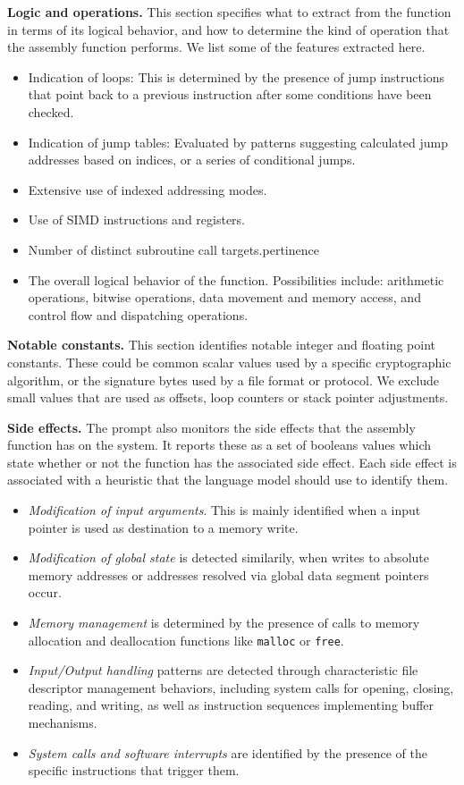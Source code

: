 \noindent \textbf{Logic and operations.}
This section specifies what to extract from the function in terms of its logical behavior, and how to determine the kind of
operation that the assembly function performs. We list some of the features extracted here.

\begin{itemize}
\item Indication of loops: This is determined by the presence of jump instructions that point back to a previous
instruction after some conditions have been checked.
\item Indication of jump tables: Evaluated by patterns suggesting calculated jump addresses based on
indices, or a series of conditional jumps.
\item Extensive use of indexed addressing modes.
\item Use of SIMD instructions and registers.
\item Number of distinct subroutine call targets.pertinence
\item The overall logical behavior of the function. Possibilities include: arithmetic operations, bitwise operations, data movement and memory access,
and control flow and dispatching operations.
\end{itemize}

\noindent \textbf{Notable constants.}
This section identifies notable integer and floating point constants.  These could be common scalar values used by
a specific cryptographic algorithm, or the signature bytes used by a file format or protocol. We exclude small
values that are used as offsets, loop counters or stack pointer adjustments.

\noindent \textbf{Side effects.}
The prompt also monitors the side effects that the assembly function has on the system.
It reports these as a set of booleans values which state whether or not the function has
the associated side effect. Each side effect is associated with a heuristic that the language model
should use to identify them.

\begin{itemize}
    \item \textit{Modification of input arguments}. This is mainly identified when a input pointer is used as destination to a memory write.
    \item \textit{Modification of global state} is detected similarily, when writes to absolute memory addresses or addresses resolved via global
        data segment pointers occur.
    \item \textit{Memory management} is determined by the presence of calls to memory allocation and deallocation
        functions like \texttt{malloc} or \texttt{free}.
    \item \textit{Input/Output handling} patterns are detected through characteristic file descriptor management behaviors, including system calls for opening, closing, reading, and writing, as well as instruction sequences implementing buffer mechanisms.
    \item \textit{System calls and software interrupts} are identified by the presence of the specific instructions that trigger them.
\end{itemize}

